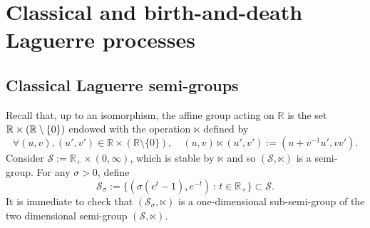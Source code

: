 \documentclass[10pt]{amsart}
\theoremstyle{definition}\newtheorem{defi}[theo]{Definition}\newtheorem{rema}[theo]{Remark}\newtheorem{exam}[theo]{Example}\newtheorem{exem}[theo]{Example}\newtheorem{nota}[theo]{Notation}
\newcommand{\df}{\mathrel{:=}}
\newcommand{\cS}{{\mathcal S}}
\newcommand{\RR}{\mathbb{R}}
\newcommand{\iy}{\infty}
\newcommand{\st}{\,:\,}
\let\oldforall\forall
\renewcommand*{\forall}{\mathrel{\oldforall}}
\begin{document}
\section{Classical and birth-and-death Laguerre processes}\label{cabadLp}

\subsection{Classical Laguerre semi-groups}\label{cLp}

Recall that, up to an isomorphism, the affine group acting on $\RR$ is the set $\RR\times\linebreak (\RR\setminus\{0\})$ endowed with the operation $\ltimes$ defined by
\[
\forall (u,v), (u',v')\in\RR\times (\RR\setminus\{0\}),\quad (u,v)\ltimes (u',v')\df (u+v^{-1}u', vv').
\]
Consider $\cS\df \RR_+\times (0,\iy)$, which is stable by $\ltimes$ and so $(\cS, \ltimes)$ is a semi-group. For any $\sigma>0$, define
\[
\cS_\sigma\df \{(\sigma(e^{t}-1),e^{-t})\st t\in\RR_+\} \subset \cS.
\]
It is immediate to check that $(\cS_\sigma,\ltimes)$ is a one-dimensional sub-semi-group of the two dimensional semi-group $(\cS, \ltimes)$.
\end{document}
